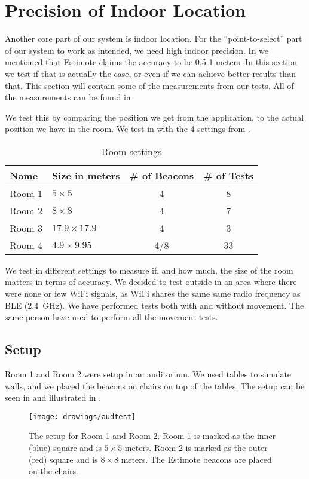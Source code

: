 \section{Precision of Indoor Location}\label{sec:estimoteprecision}
Another core part of our system is indoor location. 
For the ``point-to-select'' part of our system to work as intended, 
we need high indoor precision. 
In  we mentioned that Estimote claims the accuracy to be \num{0.5}-\num{1} meters.
In this section we test if that is actually the case, 
or even if we can achieve better results than that. 
This section will contain some of the measurements from our tests. 
All of the measurements can be found in 

We test this by comparing the position we get from the application, 
to the actual position we have in the room. 
We test in with the \num{4} settings from .

\begin{table}
    \centering
    \begin{tabular}{l| l c c}
        Name & Size in meters & \# of Beacons & \# of Tests\\ \hline
        Room 1 & $5 \times 5$ & 4 & 8 \\
        Room 2 & $8 \times 8$ & 4 & 7 \\
        Room 3 & $17.9 \times 17.9$ & 4 & 3 \\
        Room 4 & $4.9 \times 9.95$ & 4/8 &  33
    \end{tabular}
    \caption{Room settings}
    \label{table:rooms}
\end{table}

We test in different settings to measure if, and how much, 
the size of the room matters in terms of accuracy. 
We decided to test outside in an area where there were none or few WiFi signals,
as WiFi shares the same same radio frequency as BLE (\SI{2.4}{\GHz}). 
We have performed tests both with and without movement. 
The same person have used to perform all the movement tests. 

\subsection{Setup}\label{sec:setup}
Room 1 and Room 2 were setup in an auditorium. 
We used tables to simulate walls, 
and we placed the beacons on chairs on top of the tables. 
The setup can be seen in  and illustrated in . 
\begin{figure}[!htb]
    \centering
    \texttt{[image: drawings/audtest]}
    \caption{The setup for Room 1 and Room 2. Room 1 is marked as the inner (blue) square and is $5 \times 5$ meters. Room 2 is marked as the outer (red) square and is $8 \times 8$ meters. The Estimote beacons are placed on the chairs.}
    \label{fig:audtest}
\end{figure}


